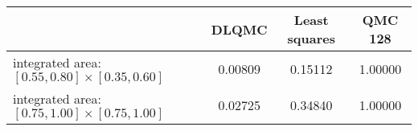 \begin{tabular}{|l|c|c|c|}
\hline
 &DLQMC&Least squares&QMC 128\\ 
\hline

integrated area: $[0.55,0.80]\times [0.35,0.60]$ & 0.00809 & 0.15112 & 1.00000\\ 
\hline
integrated area: $[0.75,1.00]\times [0.75,1.00]$ & 0.02725 & 0.34840 & 1.00000\\ 
\hline
\end{tabular}

